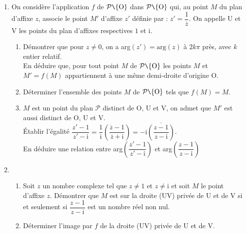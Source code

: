 \begin{exercice}
\begin{enumerate}
\item On consid\`ere l'application $f$ de $\mathcal{P}\verb+\+ \{\text{O}\}$ dans $\mathcal{P}\verb+\+ \{\text{O}\}$ qui, au point $M$ du plan d'affixe $z$, associe le point $M'$ d'affixe $z'$ d\'efinie par :  $z'= \dfrac{1}{\overline{z}}$. On appelle U et V les points du plan d'affixes respectives $1$ et i.
\begin{enumerate}
\item  D\'emontrer que pour $z \neq 0$, on a arg$\left(z'\right) =  \text{arg}(z)$ \`a $2k\pi$ pr\`es, avec $k$ entier relatif.\\
 En d\'eduire que, pour tout point $M$ de $\mathcal{P}\verb+\+ \{\text{O}\}$ les points $M$ et $M' = f(M)$ appartiennent \`a une m\^eme demi-droite d'origine O. 
\item D\'eterminer l'ensemble des points $M$ de $\mathcal{P}\verb+\+ \{\text{O}\}$ tels que $f(M) =  M$. 
\item $M$ est un point du plan $\mathcal{P}$ distinct de O, U et V, on admet que $M'$ est aussi distinct de O, U et V.\\
\'Etablir l'\'egalit\'e $\dfrac{z' - 1}{z' - \text{i}}= \dfrac{1}{\text{i}}\left(\dfrac{\overline{z} - 1}{\overline{z} + \text{i}}  \right) = -\text{i}\overline{\left(\dfrac{z - 1}{z - \text{i}} \right)}$.\\
En d\'eduire une relation entre arg$\left(\dfrac{z' - 1}{z' - \text{i}}\right)$ et  arg$\left(\dfrac{z - 1}{z - \text{i}} \right)$
\end{enumerate}
\item \begin{enumerate}
\item  Soit $z$ un nombre complexe tel que $z \neq 1$ et $z \neq \text{i}$ et soit $M$ le point d'affixe $z$. D\'emontrer que $M$
est sur la droite (UV) priv\'ee de U et de V si et seulement si  $\dfrac{z - 1}{z - \text{i}}$ est un nombre r\'eel non nul.
\item D\'eterminer l'image par $f$ de la droite (UV) priv\'ee de U et de V.
\end{enumerate}
\end{enumerate}

 
\end{exercice}
